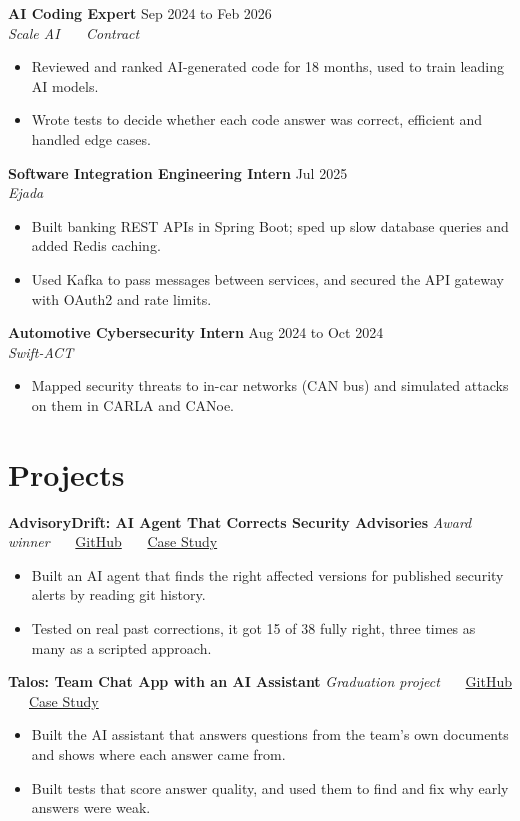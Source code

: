 \documentclass[10pt,a4paper]{article}
\newcommand{\entry}[3]{\textbf{#1} \hfill {\small\color{mutedcolor}#2}\\ \textit{#3}}
\newcommand{\project}[2]{\textbf{#1} \hfill {\small #2}}
\newcommand{\gap}{\vspace{3.5pt}}
\newcommand{\sep}{\ \textbar\ \ }
\begin{document}
\gap
\entry{AI Coding Expert}{Sep 2024 to Feb 2026}{Scale AI \sep Contract}
\begin{itemize}
\item Reviewed and ranked AI-generated code for 18 months, used to train leading AI models.
\item Wrote tests to decide whether each code answer was correct, efficient and handled edge cases.
\end{itemize}

\gap
\entry{Software Integration Engineering Intern}{Jul 2025}{Ejada}
\begin{itemize}
\item Built banking REST APIs in Spring Boot; sped up slow database queries and added Redis caching.
\item Used Kafka to pass messages between services, and secured the API gateway with OAuth2 and rate limits.
\end{itemize}

\gap
\entry{Automotive Cybersecurity Intern}{Aug 2024 to Oct 2024}{Swift-ACT}
\begin{itemize}
\item Mapped security threats to in-car networks (CAN bus) and simulated attacks on them in CARLA and CANoe.
\end{itemize}

\section{Projects}

\project{AdvisoryDrift: AI Agent That Corrects Security Advisories}{\textit{Award winner} \sep \href{https://github.com/Ab-Romia/advisorydrift}{GitHub} \sep \href{https://romia.dev/projects/advisorydrift}{Case Study}}
\begin{itemize}
\item Built an AI agent that finds the right affected versions for published security alerts by reading git history.
\item Tested on real past corrections, it got 15 of 38 fully right, three times as many as a scripted approach.
\end{itemize}

\gap
\project{Talos: Team Chat App with an AI Assistant}{\textit{Graduation project} \sep \href{https://github.com/Ab-Romia/talos}{GitHub} \sep \href{https://romia.dev/projects/talos}{Case Study}}
\begin{itemize}
\item Built the AI assistant that answers questions from the team's own documents and shows where each answer came from.
\item Built tests that score answer quality, and used them to find and fix why early answers were weak.
\end{itemize}
\end{document}
